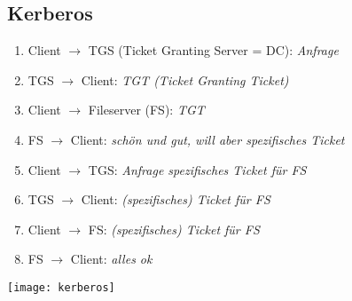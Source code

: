 \subsection{Kerberos}
\begin{minipage}{0.45\linewidth}
    \begin{enumerate}
        \item Client $\rightarrow$ TGS (Ticket Granting Server = DC): \textit{Anfrage}
        \item TGS $\rightarrow$ Client: \textit{TGT (Ticket Granting Ticket)}
        \item Client $\rightarrow$ Fileserver (FS): \textit{TGT}
        \item FS $\rightarrow$ Client: \textit{schön und gut, will aber spezifisches Ticket}
        \item Client $\rightarrow$ TGS: \textit{Anfrage spezifisches Ticket für FS}
        \item TGS $\rightarrow$ Client: \textit{(spezifisches) Ticket für FS}
        \item Client $\rightarrow$ FS: \textit{(spezifisches) Ticket für FS}
        \item FS $\rightarrow$ Client: \textit{alles ok}
    \end{enumerate}
\end{minipage}
\begin{minipage}{0.5\linewidth}
    \begin{center}
        \texttt{[image: kerberos]}
        \vspace{-8pt}
    \end{center}
\end{minipage}



